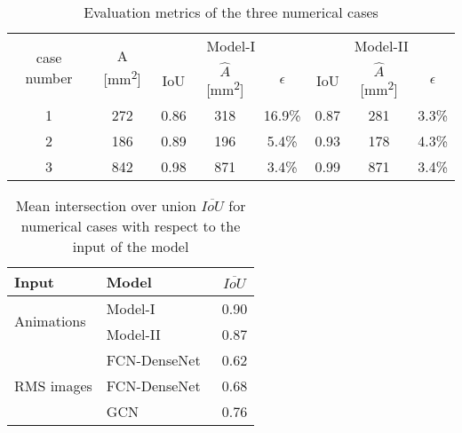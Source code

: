   
\begin{table}[]
	\caption{Evaluation metrics of the three numerical cases}
	\begin{tabular}{cccccccc}
		\toprule
		\multirow{2}{*}{case number} & \multicolumn{1}{c}{\multirow{2}{*}{A [mm\textsuperscript{2}]}} & \multicolumn{3}{c}{Model-I} & \multicolumn{3}{c}{Model-II} \\ \cmidrule(lr){3-5} \cmidrule(lr){6-8} 
		& \multicolumn{1}{c}{}  & \multicolumn{1}{c}{IoU}  & \multicolumn{1}{c}{\(\hat{A}\) [mm\textsuperscript{2}]} & \(\epsilon\) & \multicolumn{1}{c}{IoU}  & \multicolumn{1}{c}{\(\hat{A}\) [mm\textsuperscript{2}]} & \(\epsilon\) \\ 
		\midrule
		1 & 272 & \multicolumn{1}{c}{0.86} & \multicolumn{1}{c}{318} & 16.9\% & \multicolumn{1}{c}{0.87} & \multicolumn{1}{c}{281} & 3.3\% \\ 
		2 &  186  & \multicolumn{1}{c}{0.89} & \multicolumn{1}{c}{196} & 5.4\% & \multicolumn{1}{c}{0.93} & \multicolumn{1}{c}{178} & 4.3\% \\ 
		3 & 842 & \multicolumn{1}{c}{0.98} &\multicolumn{1}{c}{871} & 3.4\%   & \multicolumn{1}{c}{0.99} & \multicolumn{1}{c}{871} & 3.4\% \\ 
		\bottomrule
	\end{tabular}	
	\label{tab:num_cases}
\end{table}
\begin{table}[]
	\centering
	\caption{Mean intersection over union \(\overline{IoU}\) for numerical cases with respect to the input of the model}
	\begin{tabular}{llc}
		\toprule
		Input & Model & \(\overline{IoU}\) \\ 
		\midrule
		\multirow{2}{*}{Animations} & Model-I & 0.90 \\ & Model-II                    & 0.87     \\ \midrule
		\multirow{3}{*}{RMS images}  & FCN-DenseNet~\cite{Ijjeh2021} & 0.62     \\
		& FCN-DenseNet~\cite{Ijjeh2022} & 0.68     \\
		& GCN~\cite{Ijjeh2022}          & 0.76     \\ 
		\bottomrule
	\end{tabular}
	\label{tab:meanIoU_vs_input}
\end{table}

